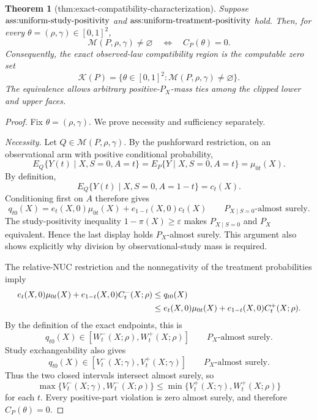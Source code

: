 \documentclass{article}
\newtheorem{theorem}{Theorem}
\begin{document}
\begin{theorem}[thm:exact-compatibility-characterization]\label{thm:exact-compatibility-characterization}
Suppose \(\textup{ass:uniform-study-positivity}\) and \(\textup{ass:uniform-treatment-positivity}\) hold. Then, for every \(\theta=(\rho,\gamma)\in[0,1]^2\),\[\mathcal M(P,\rho,\gamma)\ne\varnothing \quad\Longleftrightarrow\quad C_P(\theta)=0.\]Consequently, the exact observed-law compatibility region is the computable zero set\[\mathcal K(P)=\{\theta\in[0,1]^2:\mathcal M(P,\rho,\gamma)\ne\varnothing\}.\]The equivalence allows arbitrary positive-\(P_X\)-mass ties among the clipped lower and upper faces.
\end{theorem}
\begin{proof}
Fix \(\theta=(\rho,\gamma)\). We prove necessity and sufficiency separately.

\emph{Necessity.} Let \(Q\in\mathcal M(P,\rho,\gamma)\). By the pushforward restriction, on an observational arm with positive conditional probability,\[E_Q\{Y(t)\mid X,S=0,A=t\}=E_P\{Y\mid X,S=0,A=t\}=\mu_{0t}(X).\]By definition,\[E_Q\{Y(t)\mid X,S=0,A=1-t\}=c_t(X).\]Conditioning first on \(A\) therefore gives\[q_{t0}(X)=e_t(X,0)\mu_{0t}(X)+e_{1-t}(X,0)c_t(X)\qquad P_{X\mid S=0}\text{-almost surely}.\]The study-positivity inequality \(1-\pi(X)\ge\varepsilon\) makes \(P_{X\mid S=0}\) and \(P_X\) equivalent. Hence the last display holds \(P_X\)-almost surely. This argument also shows explicitly why division by observational-study mass is required.

The relative-NUC restriction and the nonnegativity of the treatment probabilities imply\[
\makebox[\linewidth][c]{\resizebox{0.98\linewidth}{!}{\par\noindent \makebox[\linewidth][c]{\resizebox{0.98\linewidth}{!}{\(\displaystyle \displaystyle \begin{aligned}e_t(X,0)\mu_{0t}(X)+e_{1-t}(X,0)C_t^-(X;\rho)&\le q_{t0}(X)\\&\le e_t(X,0)\mu_{0t}(X)+e_{1-t}(X,0)C_t^+(X;\rho).\end{aligned}\)}}\par\noindent}}
\]By the definition of the exact endpoints, this is\[q_{t0}(X)\in[W_t^-(X;\rho),W_t^+(X;\rho)]\qquad P_X\text{-almost surely}.\]Study exchangeability also gives\[q_{t0}(X)\in[V_t^-(X;\gamma),V_t^+(X;\gamma)]\qquad P_X\text{-almost surely}.\]Thus the two closed intervals intersect almost surely, so\[\max\{V_t^-(X;\gamma),W_t^-(X;\rho)\}\le\min\{V_t^+(X;\gamma),W_t^+(X;\rho)\}\]for each \(t\). Every positive-part violation is zero almost surely, and therefore \(C_P(\theta)=0\).


\end{proof}
\end{document}
